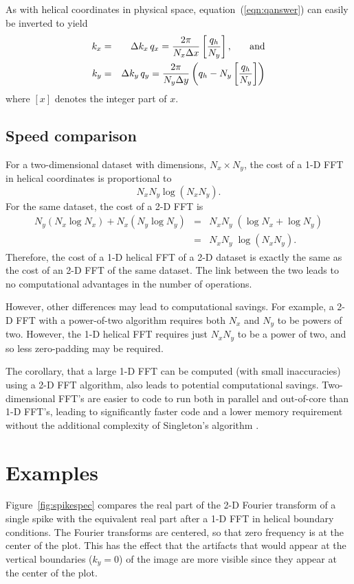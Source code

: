 \par
As with helical coordinates in physical space, 
equation~(\ref{eqn:qanswer}) can easily be inverted to yield
\begin{eqnarray}
k_x & = & \Delta k_x \, q_x = \frac{2 \pi}{N_x \Delta x} 
\left[ \frac{q_h}{N_y}\right], \hspace{0.25in} {\rm and} \\
k_y & = & \Delta k_y \, q_y = \frac{2 \pi}{N_y \Delta y}
\left(
q_h - N_y \left[ \frac{q_h}{N_y}\right]
\right)
\end{eqnarray}
where $[x]$ denotes the integer part of $x$. 

\subsection{Speed comparison}
For a two-dimensional dataset with dimensions, $N_x \times N_y$, the
cost of a 1-D FFT in helical coordinates is proportional to
\begin{equation}
N_x N_y \log \left( N_x N_y \right).
\end{equation}
For the same dataset, the cost of a 2-D FFT is 
\begin{eqnarray}
N_y \left( N_x \log N_x \right) + N_x \left( N_y \log N_y
\right)
& = & N_x N_y \; \left( \log N_x + \log N_y \right)  \nonumber \\
& = & N_x N_y \; \log \left( N_x N_y \right).
\end{eqnarray}
Therefore, the cost of a 1-D helical FFT of a 2-D dataset 
is exactly the same as the cost of an 2-D FFT of the same dataset.
The link between the two leads to no computational advantages in the
number of operations.

However, other differences may lead to computational savings.  For
example, a 2-D FFT with a power-of-two algorithm requires both $N_x$
and $N_y$ to be powers of two. However, the 1-D helical FFT requires
just $N_x N_y$ to be a power of two, and so less zero-padding may be
required.  

The corollary, that a large 1-D FFT 
can be computed (with small inaccuracies) using a 2-D FFT algorithm, 
also leads to potential computational savings.
Two-dimensional FFT's are easier to code to run both in parallel and
out-of-core than 1-D FFT's, leading to significantly faster code and a
lower memory requirement without the additional complexity of
Singleton's algorithm \cite{numrec}.

\section{Examples}
Figure~\ref{fig:spikespec} compares the real part of the 2-D  Fourier
transform of a single spike with the equivalent real part after a 1-D
FFT in helical boundary conditions.  The Fourier transforms are
centered, so that zero frequency is at the center of the plot.  This
has the effect that the artifacts that would appear at the vertical
boundaries ($k_y=0$) of the image are more visible since they appear
at the center of the plot.

